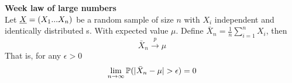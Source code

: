\begin{teo}
	\textbf{Week law of large numbers}\\
	Let $\underline X=(X_1... X_n)$ be a random sample of size $n$ with $X_i$ independent and identically distributed \rv s. With  expected value $\mu$.
	Define $\bar X_n=\frac{1}{n}\sum_{i=1}^{n}X_i$, then
	$$\bar X_n \xrightarrow{p} \mu$$
	That is, for any $\epsilon>0$
	$$\lim_{n\to \infty}\p(|\bar X_n- \mu|>\epsilon)=0$$
\end{teo}


